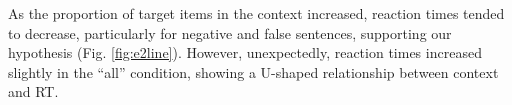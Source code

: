 \documentclass[10pt,letterpaper]{article}
\begin{document}



As the proportion of target items in the context increased, reaction times tended to decrease, particularly for negative and false sentences, supporting our hypothesis (Fig. \ref{fig:e2line}).  However, unexpectedly, reaction times increased slightly in the ``all'' condition, showing a U-shaped relationship between context and RT.  
\end{document}
